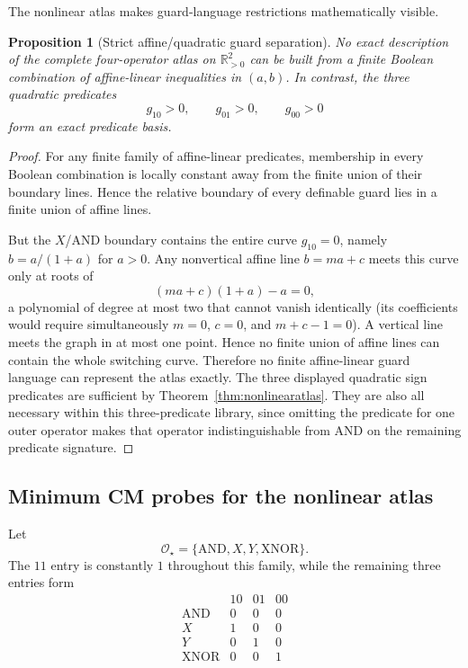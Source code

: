 \documentclass[11pt]{article}
\newtheorem{proposition}[theorem]{Proposition}
\theoremstyle{definition}
\theoremstyle{remark}
\newcommand{\R}{\mathbb{R}}
\begin{document}
The nonlinear atlas makes guard-language restrictions mathematically visible.

\begin{proposition}[Strict affine/quadratic guard separation]\label{prop:guarddegreegap}
No exact description of the complete four-operator atlas on $\R_{>0}^2$ can be built from a finite Boolean combination of affine-linear inequalities in $(a,b)$. In contrast, the three quadratic predicates
\[
 g_{10}>0,\qquad g_{01}>0,\qquad g_{00}>0
\]
form an exact predicate basis.
\end{proposition}

\begin{proof}
For any finite family of affine-linear predicates, membership in every Boolean combination is locally constant away from the finite union of their boundary lines. Hence the relative boundary of every definable guard lies in a finite union of affine lines.

But the $X$/AND boundary contains the entire curve $g_{10}=0$, namely $b=a/(1+a)$ for $a>0$. Any nonvertical affine line $b=ma+c$ meets this curve only at roots of
\[
 (ma+c)(1+a)-a=0,
\]
a polynomial of degree at most two that cannot vanish identically (its coefficients would require simultaneously $m=0$, $c=0$, and $m+c-1=0$). A vertical line meets the graph in at most one point. Hence no finite union of affine lines can contain the whole switching curve. Therefore no finite affine-linear guard language can represent the atlas exactly. The three displayed quadratic sign predicates are sufficient by Theorem~\ref{thm:nonlinearatlas}. They are also all necessary within this three-predicate library, since omitting the predicate for one outer operator makes that operator indistinguishable from AND on the remaining predicate signature.
\end{proof}

\subsection{Minimum CM probes for the nonlinear atlas}

Let
\[
 \mathcal O_\star=\{\mathrm{AND},X,Y,\mathrm{XNOR}\}.
\]
The $11$ entry is constantly $1$ throughout this family, while the remaining three entries form
\[
\begin{array}{c|ccc}
 &10&01&00\\\hline
\mathrm{AND}&0&0&0\\
X&1&0&0\\
Y&0&1&0\\
\mathrm{XNOR}&0&0&1
\end{array}
\]
\end{document}

